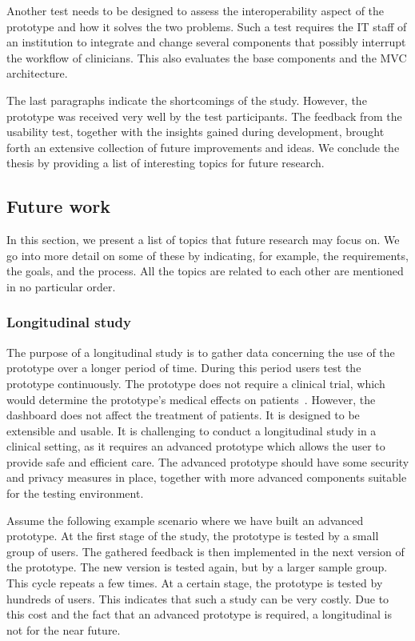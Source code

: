     Another test needs to be designed to assess the interoperability aspect of the prototype and how it solves the two problems. Such a test requires the IT staff of an institution to integrate and change several components that possibly interrupt the workflow of clinicians. This also evaluates the base components and the MVC architecture.

    The last paragraphs indicate the shortcomings of the study. However, the prototype was received very well by the test participants. The feedback from the usability test, together with the insights gained during development, brought forth an extensive collection of future improvements and ideas. We conclude the thesis by providing a list of interesting topics for future research.

    \subsection{Future work}\label{future_work}

    In this section, we present a list of topics that future research may focus on. We go into more detail on some of these by indicating, for example, the requirements, the goals, and the process. All the topics are related to each other are mentioned in no particular order.
 
    \subsubsection{Longitudinal study}

    The purpose of a longitudinal study is to gather data concerning the use of the prototype over a longer period of time. During this period users test the prototype continuously. The prototype does not require a clinical trial, which would determine the prototype's medical effects on patients~\cite{Minneci2018}. However, the dashboard does not affect the treatment of patients. It is designed to be extensible and usable. It is challenging to conduct a longitudinal study in a clinical setting, as it requires an advanced prototype which allows the user to provide safe and efficient care. The advanced prototype should have some security and privacy measures in place, together with more advanced components suitable for the testing environment.
    
    Assume the following example scenario where we have built an advanced prototype. At the first stage of the study, the prototype is tested by a small group of users. The gathered feedback is then implemented in the next version of the prototype. The new version is tested again, but by a larger sample group. This cycle repeats a few times. At a certain stage, the prototype is tested by hundreds of users. This indicates that such a study can be very costly. Due to this cost and the fact that an advanced prototype is required, a longitudinal is not for the near future. 

